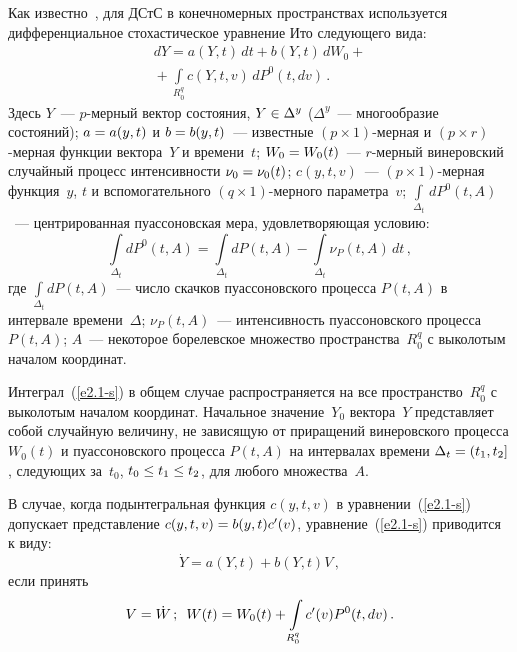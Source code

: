 \begin{multicols}{2}
Как известно~\cite{1-s, 2-s}, для ДСтС в
конечномерных пространствах используется дифференциальное стохастическое
уравнение Ито следующего \mbox{вида}:
    \begin{multline}
    dY= a (Y,t) \,dt + b(Y,t)\, d W_0 +{}\\
    {}+ \int\limits_{R_0^q} c(Y,t,v)\, dP^0 (t,dv)\,.
    \label{e2.1-s}
    \end{multline}
Здесь $Y$~--- $p$-мер\-ный вектор состояния, $Y\hm\in \Delta^y$
($\Delta^y$~--- многообразие состояний);
$a\hm=a (y,t)$ и $b\hm= b(y,t)$~--- известные $(p\times 1)$-мер\-ная и
$(p\times r)$-мер\-ная функции вектора~$Y$ и времени~$t$; $W_0\hm= W_0(t)$~---\linebreak
$r$-мер\-ный винеровский случайный процесс интенсивности $\nu_0\hm=
\nu_0(t)$; $c(y, t,v)$~--- $(p\times 1)$-мер\-ная функция~$y$, $t$ и
вспомогательного $(q\times 1)$-мер\-но\-го параметра~$v$;
$\int\limits_{\Delta_t}\, d P^0 (t,A)$~---
центрированная пуассоновская мера, удовлетворяющая условию:
 \begin{equation}
 \int\limits_{\Delta_t} d P^0 (t,A)= \int\limits_{\Delta_t} d P (t,A)-
    \int\limits_{\Delta_t} \nu_P (t,A) \,dt\,,
    \label{e2.2-s}
    \end{equation}
где $\int\limits_{\Delta_t} d P (t,A)$~--- число скачков пуассоновского
процесса $P (t,A)$ в интервале времени~$\Delta$; $\nu_P (t,A)$~--- интенсивность
пуассоновского процесса $P(t,A)$; $A$~--- некоторое борелевское
множество пространства~$R^q_0$ с выколотым началом координат.

Интеграл~(\ref{e2.1-s}) в общем случае распространяется на все пространство~$R_0^q$
с выколотым началом координат.
Начальное значение~$Y_0$ вектора~$Y$ пред\-став\-ля\-ет
собой случайную величину, не зависящую от приращений винеровского
процесса $W_0(t)$ и пуассоновского процесса $P(t,A)$ на интервалах
времени $\Delta_t \hm= (t_1, t_2]$, следующих за~$t_0$, $t_0\hm\le t_1\hm\le t_2$,
для любого множества~$A$.

В случае, когда подынтегральная функция $c(y,t,v)$ в уравнении~(\ref{e2.1-s})
допускает представление $c(y,t,v)\hm= b(y,t) c'(v)$,
уравнение~(\ref{e2.1-s}) приводится к  виду:
\begin{equation*}
{\dot Y} = a (Y, t) +b(Y, t)V\,, %
\end{equation*}
если принять
\begin{equation*}
V=\dot W\,;\enskip W(t)= W_0(t) +\int\limits_{R_0^q} c'(v) P^0 (t, dv)\,.
\end{equation*}


\end{multicols}
